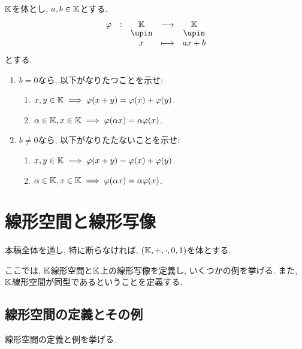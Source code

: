 \begin{quiz}
  $\mathbb{K}$を体とし, $a, b\in \mathbb{K}$とする.
  \begin{align*}
    \shazo{\varphi}{\KK}{\KK}{x}{ax+b}
  \end{align*}
  とする.
  \begin{enumerate}
  \item
  $b=0$なら, 以下がなりたつことを示せ:
  \begin{enumerate}
    \item $x,y\in \mathbb{K}\implies \varphi(x+y)=\varphi(x)+\varphi(y)$.
    \item $\alpha\in\mathbb{K}, x\in \mathbb{K}\implies \varphi(\alpha x)=\alpha\varphi(x)$.
  \end{enumerate}
  \item
  $b\neq 0$なら, 以下がなりたたないことを示せ:
  \begin{enumerate}
    \item $x,y\in \mathbb{K}\implies \varphi(x+y)=\varphi(x)+\varphi(y)$.
    \item $\alpha\in\mathbb{K}, x\in \mathbb{K}\implies \varphi(\alpha x)=\alpha\varphi(x)$.
  \end{enumerate}
  \end{enumerate}
\end{quiz}


\chapter{線形空間と線形写像}
本稿全体を通し,
特に断らなければ,
$(\mathbb{K},+,\cdot,0,1)$を体とする.

ここでは, $\mathbb{K}$線形空間と$\mathbb{K}$上の線形写像を定義し,
いくつかの例を挙げる.
また, $\mathbb{K}$線形空間が同型であるということを定義する.

\section{線形空間の定義とその例}

線形空間の定義と例を挙げる.

